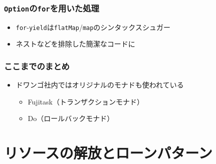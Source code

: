 \begin{frame}
  \frametitle{\protect\lstinline|Option|の\protect\lstinline|for|を用いた処理}


  \begin{itemize}
    \item<3-> \lstinline|for|-\lstinline|yield|は\lstinline|flatMap|/\lstinline|map|のシンタックスシュガー
    \item<4-> ネストなどを排除した簡潔なコードに
  \end{itemize}
\end{frame}

\begin{frame}
  \frametitle{ここまでのまとめ}

  \begin{center}
  \end{center}

  \begin{itemize}
    \item<3-> ドワンゴ社内ではオリジナルのモナドも使われている
    \begin{itemize}
      \item<4-> Fujitask（トランザクションモナド）\cite{fujitask,scalamatsuri2016,fujitasksimple}
      \item<4-> Do（ロールバックモナド）
    \end{itemize}
  \end{itemize}

  \begin{center}
  \end{center}  
\end{frame}

\section{リソースの解放とローンパターン}

